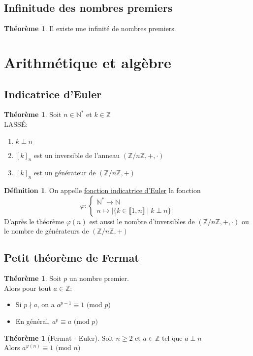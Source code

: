 \documentclass[10pt,a4paper]{article}
\theoremstyle{definition}
\newtheorem{theorem}[proposition]{Théorème}
\newtheorem{definition}[proposition]{Définition}
\begin{document}
\subsection{Infinitude des nombres premiers}
\begin{theorem}
Il existe une infinité de nombres premiers.
\end{theorem}

\section{Arithmétique et algèbre}
\subsection{Indicatrice d'Euler}
\begin{theorem}
Soit $n \in \mathbb{N}^*$ et $k \in \mathbb{Z}$ \\
LASSÉ:
\begin{enumerate}
\item $k \perp n$
\item $[k]_n$ est un inversible de l'anneau $(\mathbb{Z}/n\mathbb{Z}, +, \cdot)$
\item $[k]_n$ est un générateur de $(\mathbb{Z}/n\mathbb{Z}, +)$
\end{enumerate}
\end{theorem}

\pagebreak

\begin{definition}
On appelle \uline{fonction indicatrice d'Euler} la fonction
\[ \varphi : \begin{cases}
\mathbb{N}^* \to \mathbb{N} \\
n \mapsto \left| \{ k \in \llbracket 1, n \rrbracket \mid k \perp n \} \right|
\end{cases}\]
D'après le théorème $\varphi(n)$ est aussi le nombre d'inversibles de $(\mathbb{Z}/n\mathbb{Z}, +, \cdot)$ ou le nombre de générateurs de $(\mathbb{Z}/n\mathbb{Z}, +)$
\end{definition}

\subsection{Petit théorème de Fermat}
\begin{theorem}
Soit $p$ un nombre premier. \\
Alors pour tout $a \in \mathbb{Z}$:
\begin{itemize}
\item Si $p \nmid a$, on a $a^{p - 1} \equiv 1 \text{ (mod $p$) }$
\item En général, $a^p \equiv a \text{ (mod $p$) }$
\end{itemize}
\end{theorem}
\begin{theorem}[Fermat - Euler]
Soit $n \geq 2$ et $a \in \mathbb{Z}$ tel que $a \perp n$ \\
Alors $a^{\varphi(n)} \equiv 1 \text{ (mod $n$) }$
\end{theorem}
\end{document}
